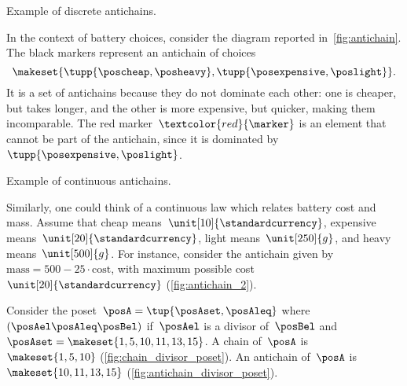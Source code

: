 \begin{marginfigure}
    \centering
    \caption{Example of discrete antichains.}
    \label{fig:antichain}
\end{marginfigure}
\begin{example}
    In the context of battery choices, consider the diagram reported in~\cref{fig:antichain}.
    The black markers represent an antichain of choices
    \begin{equation*}
        \makeset{
            \tupp{\poscheap,\posheavy},
            \tupp{\posexpensive,\poslight}
        }.
    \end{equation*}
    It is a set of antichains because they do not dominate each other: one is cheaper, but takes longer, and the other is more expensive, but quicker, making them incomparable.
    The red marker~$\textcolor{red}{\marker}$ is an element that cannot be part of the antichain, since it is dominated by~$\tupp{\posexpensive,\poslight}$.
    \begin{marginfigure}
        \centering
        \caption{Example of continuous antichains.}
        \label{fig:antichain_2}
    \end{marginfigure}

    Similarly, one could think of a continuous law which relates battery cost and mass.
    Assume that cheap means~$\unit[10]{\standardcurrency}$, expensive means~$\unit[20]{\standardcurrency}$, light means~$\unit[250]{g}$, and heavy means~$\unit[500]{g}$.
    For instance, consider the antichain given by~$\text{mass}=500-25\cdot \text{cost}$, with maximum possible cost~$\unit[20]{\standardcurrency}$ (\cref{fig:antichain_2}).
\end{example}

\vspace{5cm}

\begin{marginfigure}
    \begin{center}
    \end{center}
    \caption{\label{fig:chain_divisor_poset}}
\end{marginfigure}

\begin{marginfigure}
    \begin{center}
    \end{center}
    \caption{\label{fig:antichain_divisor_poset}}
\end{marginfigure}

\begin{example}
    Consider the poset~$\posA=\tup{\posAset,\posAleq}$ where~$(\posAel \posAleq \posBel)$ if~$\posAel$ is a divisor of~$\posBel$ and~$\posAset=\makeset{1,5,10,11,13,15}$.
    A chain of~$\posA$ is~$\makeset{1,5,10}$ (\cref{fig:chain_divisor_poset}).
    An antichain of~$\posA$ is~$\makeset{10,11,13,15}$ (\cref{fig:antichain_divisor_poset}).
\end{example}
